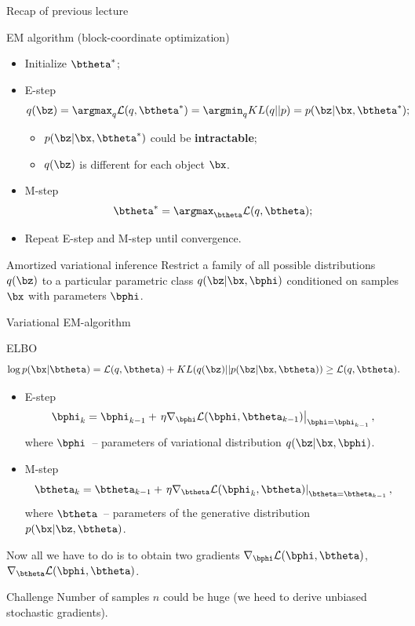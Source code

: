 \begin{frame}{Recap of previous lecture}
	\begin{block}{EM algorithm (block-coordinate optimization)}
	\begin{itemize}
		\item Initialize $\btheta^*$;
		\item E-step
			\vspace{-0.3cm}
			\[
				q(\bz) = \argmax_q \mathcal{L} (q, \btheta^*) = \argmin_q KL(q || p) =
				 p(\bz| \bx, \btheta^*);
			\]
			\vspace{-0.5cm}
			\begin{itemize}
				\item $p(\bz| \bx, \btheta^*)$ could be \textbf{intractable};
				\item $q(\bz)$ is different for each object $\bx$.
			\end{itemize}
		\item M-step
			\[
				\btheta^* = \argmax_{\btheta} \mathcal{L} (q, \btheta);
			\]
		\item Repeat E-step and M-step until convergence.
	\end{itemize}
	\end{block}
	\begin{block}{Amortized variational inference}
	Restrict a family of all possible distributions $q(\bz)$ to a particular parametric class $q(\bz|\bx, \bphi)$ conditioned on samples $\bx$ with parameters $\bphi$.
	\end{block}
\end{frame}
\begin{frame}{Variational EM-algorithm}

	\begin{block}{ELBO}
		\vspace{-0.1cm}
		\[
		\log p(\bx| \btheta) = \mathcal{L} (q, \btheta) + KL(q(\bz) || p(\bz|\bx, \btheta)) \geq \mathcal{L} (q, \btheta).
		\]
	\end{block}
	\begin{itemize}
		\item E-step
		\[
		\bphi_k = \bphi_{k-1} + \left.\eta \nabla_{\bphi} \mathcal{L}(\bphi, \btheta_{k-1})\right|_{\bphi=\bphi_{k-1}},
		\]
		where $\bphi$~-- parameters of variational distribution $q(\bz | \bx, \bphi)$.
		\item M-step
		\[
		\btheta_k = \btheta_{k-1} + \left.\eta \nabla_{\btheta} \mathcal{L}(\bphi_k, \btheta)\right|_{\btheta=\btheta_{k-1}},
		\]
		where $\btheta$~-- parameters of the generative distribution $p(\bx | \bz, \btheta)$.
	\end{itemize}
	Now all we have to do is to obtain two gradients $\nabla_{\bphi} \mathcal{L}(\bphi, \btheta)$, $\nabla_{\btheta} \mathcal{L}(\bphi, \btheta)$.  \\
	\begin{block}{Challenge}
		Number of samples $n$ could be huge (we heed to derive unbiased stochastic gradients).
	\end{block}
\end{frame}
